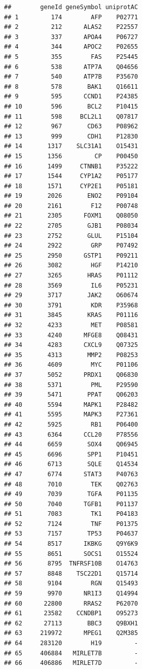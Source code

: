 \documentclass[
]{article}
\begin{document}
\begin{verbatim}
##        geneId geneSymbol uniprotAC
## 1         174        AFP    P02771
## 2         212      ALAS2    P22557
## 3         337      APOA4    P06727
## 4         344      APOC2    P02655
## 5         355        FAS    P25445
## 6         538      ATP7A    Q04656
## 7         540      ATP7B    P35670
## 8         578       BAK1    Q16611
## 9         595      CCND1    P24385
## 10        596       BCL2    P10415
## 11        598     BCL2L1    Q07817
## 12        967       CD63    P08962
## 13        999       CDH1    P12830
## 14       1317    SLC31A1    O15431
## 15       1356         CP    P00450
## 16       1499     CTNNB1    P35222
## 17       1544     CYP1A2    P05177
## 18       1571     CYP2E1    P05181
## 19       2026       ENO2    P09104
## 20       2161        F12    P00748
## 21       2305      FOXM1    Q08050
## 22       2705       GJB1    P08034
## 23       2752       GLUL    P15104
## 24       2922        GRP    P07492
## 25       2950      GSTP1    P09211
## 26       3082        HGF    P14210
## 27       3265       HRAS    P01112
## 28       3569        IL6    P05231
## 29       3717       JAK2    O60674
## 30       3791        KDR    P35968
## 31       3845       KRAS    P01116
## 32       4233        MET    P08581
## 33       4240      MFGE8    Q08431
## 34       4283      CXCL9    Q07325
## 35       4313       MMP2    P08253
## 36       4609        MYC    P01106
## 37       5052      PRDX1    Q06830
## 38       5371        PML    P29590
## 39       5471       PPAT    Q06203
## 40       5594      MAPK1    P28482
## 41       5595      MAPK3    P27361
## 42       5925        RB1    P06400
## 43       6364      CCL20    P78556
## 44       6659       SOX4    Q06945
## 45       6696       SPP1    P10451
## 46       6713       SQLE    Q14534
## 47       6774      STAT3    P40763
## 48       7010        TEK    Q02763
## 49       7039       TGFA    P01135
## 50       7040      TGFB1    P01137
## 51       7083        TK1    P04183
## 52       7124        TNF    P01375
## 53       7157       TP53    P04637
## 54       8517      IKBKG    Q9Y6K9
## 55       8651      SOCS1    O15524
## 56       8795  TNFRSF10B    O14763
## 57       8848    TSC22D1    Q15714
## 58       9104        RGN    Q15493
## 59       9970      NR1I3    Q14994
## 60      22800      RRAS2    P62070
## 61      23582    CCNDBP1    O95273
## 62      27113       BBC3    Q9BXH1
## 63     219972      MPEG1    Q2M385
## 64     283120        H19         -
## 65     406884   MIRLET7B         -
## 66     406886   MIRLET7D         -

\end{verbatim}
\end{document}
